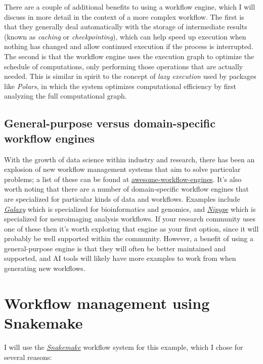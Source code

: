There are a couple of additional benefits to using a workflow engine, which I will discuss in more detail in the context of a more complex workflow. The first is that they generally deal automatically with the storage of intermediate results (known as \textit{caching} or \textit{checkpointing}), which can help speed up execution when nothing has changed and allow continued execution if the process is interrupted.  The second is that the workflow engine uses the execution graph to optimize the schedule of computations, only performing those operations that are actually needed.  This is similar in spirit to the concept of \textit{lazy execution} used by packages like \textit{Polars}, in which the system optimizes computational efficiency by first analyzing the full computational graph.

\subsection{General-purpose versus domain-specific workflow engines}

With the growth of data science within industry and research, there has been an explosion of new workflow management systems that aim to solve particular problems; a list of these can be found at \href{https://github.com/meirwah/awesome-workflow-engines}{awesome-workflow-engines}. It's also worth noting that there are a number of domain-specific workflow engines that are specialized for particular kinds of data and workflows.  Examples include \href{https://galaxyproject.org/}{\textit{Galaxy}} which is specialized for bioinformatics and genomics, and \href{https://nipype.readthedocs.io/en/latest/index.html}{\textit{Nipype}} which is specialized for neuroimaging analysis workflows. If your research community uses one of these then it's worth exploring that engine as your first option, since it will probably be well supported within the community. However, a benefit of using a general-purpose engine is that they will often be better maintained and supported, and AI tools will likely have more examples to work from when generating new workflows.

\section{Workflow management using Snakemake}

I will use the \href{https://snakemake.readthedocs.io/en/stable/}{\textit{Snakemake}} workflow system for this example, which I chose for several reasons:


